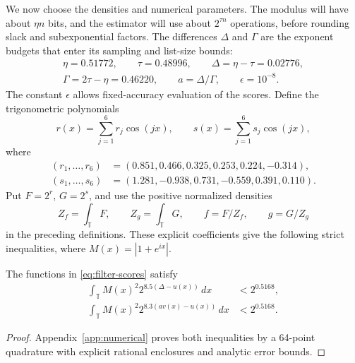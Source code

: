 We now choose the densities and numerical parameters.  The modulus
will have about $\eta n$ bits, and the estimator will use about
$2^{\tau n}$ operations, before rounding slack and subexponential
factors.  The differences $\Delta$ and $\Gamma$ are the exponent
budgets that enter its sampling and list-size bounds:
\begin{equation}\label{eq:filtering-constants}
\begin{gathered}
 \eta=0.51772,\qquad \tau=0.48996,\qquad
 \Delta=\eta-\tau=0.02776,\\
 \Gamma=2\tau-\eta=0.46220,\qquad
 a=\Delta/\Gamma,\qquad \epsilon=10^{-8}.
\end{gathered}
\end{equation}
The constant $\epsilon$ allows fixed-accuracy evaluation of the scores.
Define the trigonometric polynomials
\begin{equation}\label{eq:filter-polynomials}
 r(x)=\sum_{j=1}^{6}r_j\cos(jx),\qquad
 s(x)=\sum_{j=1}^{6}s_j\cos(jx),
\end{equation}
where
\[
\begin{split}
 (r_1,\ldots,r_6)&=(0.851,0.466,0.325,0.253,0.224,-0.314),\\
 (s_1,\ldots,s_6)&=(1.281,-0.938,0.731,-0.559,0.391,0.110).
\end{split}
\]
Put $F=2^r$, $G=2^s$, and use the positive normalized densities
\[
 Z_f=\int_{\mathbb T}F,\qquad Z_g=\int_{\mathbb T}G,
 \qquad f=F/Z_f,\qquad g=G/Z_g
\]
in the preceding definitions.  These explicit coefficients give the
following strict inequalities, where $M(x)=|1+e^{ix}|$.

\begin{proposition}\label{prop:filtering-moments}
The functions in \eqref{eq:filter-scores} satisfy
\begin{equation}\label{eq:continuous-filtering-moments}
\begin{split}
 \int_{\mathbb T}M(x)^2 2^{8.5(\Delta-u(x))}\,dx&<2^{0.5168},\\
 \int_{\mathbb T}M(x)^2 2^{8.3(a v(x)-u(x))}\,dx&<2^{0.5168}.
\end{split}
\end{equation}
\end{proposition}

\begin{proof}
Appendix~\ref{app:numerical} proves both inequalities by a 64-point
quadrature with explicit rational enclosures and analytic error bounds.
\end{proof}

